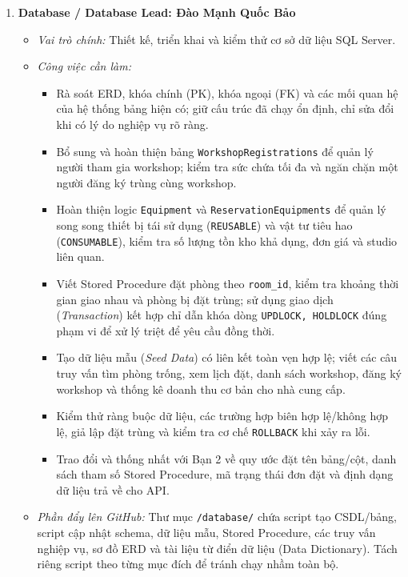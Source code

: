 \begin{enumerate}[leftmargin=1.5em]
    \item \textbf{Database / Database Lead: Đào Mạnh Quốc Bảo}
    \begin{itemize}[leftmargin=1.2em]
        \item \textit{Vai trò chính:} Thiết kế, triển khai và kiểm thử cơ sở dữ liệu SQL Server.
        \item \textit{Công việc cần làm:}
        \begin{itemize}[label={--}]
            \item Rà soát ERD, khóa chính (PK), khóa ngoại (FK) và các mối quan hệ của hệ thống bảng hiện có; giữ cấu trúc đã chạy ổn định, chỉ sửa đổi khi có lý do nghiệp vụ rõ ràng.
            \item Bổ sung và hoàn thiện bảng \texttt{WorkshopRegistrations} để quản lý người tham gia workshop; kiểm tra sức chứa tối đa và ngăn chặn một người đăng ký trùng cùng workshop.
            \item Hoàn thiện logic \texttt{Equipment} và \texttt{ReservationEquipments} để quản lý song song thiết bị tái sử dụng (\texttt{REUSABLE}) và vật tư tiêu hao (\texttt{CONSUMABLE}), kiểm tra số lượng tồn kho khả dụng, đơn giá và studio liên quan.
            \item Viết Stored Procedure đặt phòng theo \texttt{room\_id}, kiểm tra khoảng thời gian giao nhau và phòng bị đặt trùng; sử dụng giao dịch (\textit{Transaction}) kết hợp chỉ dẫn khóa dòng \texttt{UPDLOCK, HOLDLOCK} đúng phạm vi để xử lý triệt để yêu cầu đồng thời.
            \item Tạo dữ liệu mẫu (\textit{Seed Data}) có liên kết toàn vẹn hợp lệ; viết các câu truy vấn tìm phòng trống, xem lịch đặt, danh sách workshop, đăng ký workshop và thống kê doanh thu cơ bản cho nhà cung cấp.
            \item Kiểm thử ràng buộc dữ liệu, các trường hợp biên hợp lệ/không hợp lệ, giả lập đặt trùng và kiểm tra cơ chế \texttt{ROLLBACK} khi xảy ra lỗi.
            \item Trao đổi và thống nhất với Bạn 2 về quy ước đặt tên bảng/cột, danh sách tham số Stored Procedure, mã trạng thái đơn đặt và định dạng dữ liệu trả về cho API.
        \end{itemize}
        \item \textit{Phần đẩy lên GitHub:} Thư mục \texttt{/database/} chứa script tạo CSDL/bảng, script cập nhật schema, dữ liệu mẫu, Stored Procedure, các truy vấn nghiệp vụ, sơ đồ ERD và tài liệu từ điển dữ liệu (Data Dictionary). Tách riêng script theo từng mục đích để tránh chạy nhầm toàn bộ.

\end{itemize}
\end{enumerate}

